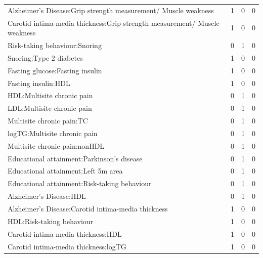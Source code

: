 \begin{table}[ht]
\begin{tabular}{lrrr}
  Alzheimer's Disease:Grip strength measurement/ Muscle weakness &   1 &   0 &   0 \\ 
  Carotid intima-media thickness:Grip strength measurement/ Muscle weakness &   1 &   0 &   0 \\ 
  Risk-taking behaviour:Snoring &   0 &   1 &   0 \\ 
  Snoring:Type 2 diabetes &   1 &   0 &   0 \\ 
  Fasting glucose:Fasting insulin &   1 &   0 &   0 \\ 
  Fasting insulin:HDL &   1 &   0 &   0 \\ 
  HDL:Multisite chronic pain &   0 &   1 &   0 \\ 
  LDL:Multisite chronic pain &   0 &   1 &   0 \\ 
  Multisite chronic pain:TC &   0 &   1 &   0 \\ 
  logTG:Multisite chronic pain &   0 &   1 &   0 \\ 
  Multisite chronic pain:nonHDL &   0 &   1 &   0 \\ 
  Educational attainment:Parkinson's disease &   0 &   1 &   0 \\ 
  Educational attainment:Left 5m area &   0 &   1 &   0 \\ 
  Educational attainment:Risk-taking behaviour &   0 &   1 &   0 \\ 
  Alzheimer's Disease:HDL &   0 &   1 &   0 \\ 
  Alzheimer's Disease:Carotid intima-media thickness &   1 &   0 &   0 \\ 
  HDL:Risk-taking behaviour &   1 &   0 &   0 \\ 
  Carotid intima-media thickness:HDL &   1 &   0 &   0 \\ 
  Carotid intima-media thickness:logTG &   1 &   0 &   0 \\ 
   \hline
\end{tabular}
\end{table}

